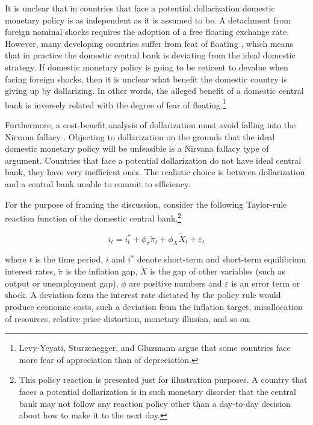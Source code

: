 \documentclass[12pt]{article}
\begin{document}
It is unclear that in countries that face a potential dollarization domestic monetary policy is as independent as it is assumed to be. A detachment from foreign nominal shocks requires the adoption of a free floating exchange rate. However, many developing countries suffer from feat of floating  \parencite{Calvo2002}, which means that in practice the domestic central bank is deviating from the ideal domestic strategy. If domestic monetary policy is going to be reticent to devalue when facing foreign shocks, then it is unclear what benefit the domestic country is giving up by dollarizing. In other words, the alleged benefit of a domestic central bank is inversely related with the degree of fear of floating.\footnote{Levy-Yeyati, Sturzenegger, and Gluzmann \parencite{Levy-Yeyati2003} argue that some countries face more fear of appreciation than of depreciation.}

Furthermore, a cost-benefit analysis of dollarization must avoid falling into the Nirvana fallacy \parencite{Demsetz1969}. Objecting to dollarization on the grounds that the ideal domestic monetary policy will be unfeasible is a Nirvana fallacy type of argument. Countries that face a potential dollarization do not have ideal central bank, they have very inefficient ones. The realistic choice is between dollarization and a central bank unable to commit to efficiency.

For the purpose of framing the discussion, consider the following Taylor-rule reaction function of the domestic central bank.\footnote{This policy reaction is presented just for illustration purposes. A country that faces a potential dollarization is in such monetary disorder that the central bank may not follow any reaction policy other than a day-to-day decision about how to make it to the next day.}

\begin{equation} \label{Eq:1}
    i_t = i^*_t + \phi_\pi \tilde{\pi}_t + \phi_X \tilde{X}_t + \varepsilon_t
\end{equation}

where $t$ is the time period, $i$ and $i^*$ denote short-term and short-term equilibrium interest rates, $\tilde{\pi}$ is the inflation gap, $\tilde{X}$ is the gap of other variables (such as output or unemployment gap), $\phi$ are positive numbers and $\varepsilon$ is an error term or shock. A deviation form the interest rate dictated by the policy rule would produce economic costs, such a deviation from the inflation target, misallocation of resources, relative price distortion, monetary illusion, and so on.
\end{document}
